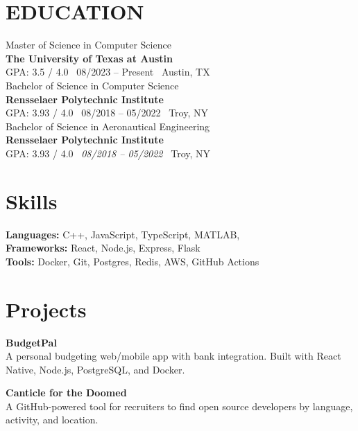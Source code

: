 \documentclass[11pt]{article}
\begin{document}
\begin{minipage}[t]{0.65\textwidth}
    \section*{EDUCATION}
    {\Large Master of Science in Computer Science} \\
    \textbf{The University of Texas at Austin} \\
    GPA: 3.5 / 4.0 \textbar\ 08/2023 -- Present \textbar\ Austin, TX\\

    {\Large Bachelor of Science in Computer Science} \\
    \textbf{Rensselaer Polytechnic Institute} \\
    GPA: 3.93 / 4.0 \textbar\ 08/2018 -- 05/2022 \textbar\ Troy, NY\\

    {\Large Bachelor of Science in Aeronautical Engineering} \\
    \textbf{Rensselaer Polytechnic Institute} \\
    GPA: 3.93 / 4.0 \textbar\ \textit{08/2018 -- 05/2022} \textbar\ Troy, NY
\end{minipage}
\hfill
\begin{minipage}[t]{0.32\textwidth}
    \section*{Skills}

    \textbf{Languages:} C++, JavaScript, TypeScript, MATLAB,  \\
    \textbf{Frameworks:} React, Node.js, Express, Flask \\
    \textbf{Tools:} Docker, Git, Postgres, Redis, AWS, GitHub Actions

    \section*{Projects}

    \textbf{BudgetPal} \\
    A personal budgeting web/mobile app with bank integration. Built with React Native, Node.js, PostgreSQL, and Docker.

    \textbf{Canticle for the Doomed} \\
    A GitHub-powered tool for recruiters to find open source developers by language, activity, and location.
\end{minipage}
\end{document}
